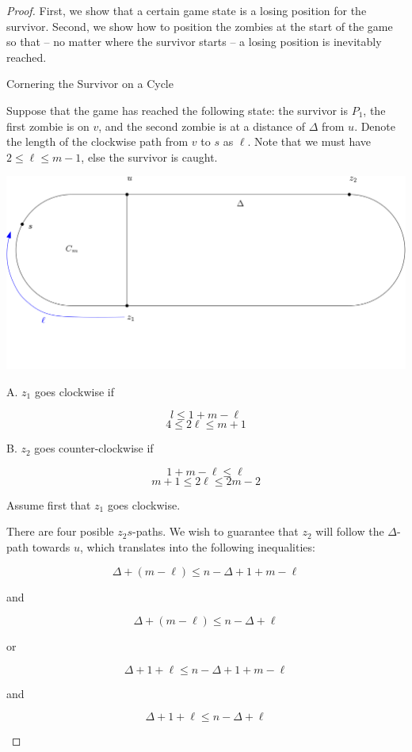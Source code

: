 \documentclass[letterpaper, 10pt]{article}
\begin{document}
\begin{proof}
First, we show that a certain game state is a losing position for the survivor.
Second, we show how to position the zombies at the start of the game so that --
no matter where the survivor starts -- a losing position is inevitably reached.

\begin{proofpart} Cornering the Survivor on a Cycle

Suppose that the game has reached the following state: the survivor is $P_1$,
the first zombie is on $v$, and the second
zombie is at a distance of $\Delta$ from $u$. Denote the length of the clockwise
path from $v$ to $s$ as $\ell$. Note that we must have $2 \leq \ell \leq m-1$,
else the survivor is caught.

\begin{center}
 \includegraphics[scale=0.20]{diagram1}
\end{center}

A. $z_1$ goes clockwise if

\[ l \leq 1 + m - \ell \]
\[ 4 \leq 2 \ell \leq m + 1 \]

B. $z_2$ goes counter-clockwise if

\[ 1 + m - \ell \leq \ell \]
\[ m + 1 \leq 2 \ell \leq 2m - 2 \]

Assume first that $z_1$ goes clockwise.

There are four posible $z_2s$-paths. We wish to guarantee that $z_2$ will follow
the $\Delta$-path towards $u$, which translates into the following inequalities:

\[  \Delta + (m - \ell) \leq n - \Delta + 1 + m - \ell \]
\begin{center}and\end{center}
\[ \Delta + (m - \ell) \leq n - \Delta + \ell \]

or

\[ \Delta + 1 + \ell \leq n - \Delta + 1 + m - \ell \]
\begin{center}and\end{center}
\[ \Delta + 1 + \ell \leq n - \Delta + \ell \]


\end{proofpart}
\end{proof}
\end{document}
